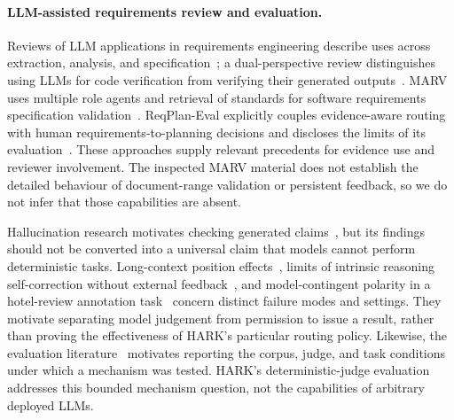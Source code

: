 \documentclass[computers,article,submit,moreauthors]{Definitions/mdpi}
\begin{document}
\paragraph{LLM-assisted requirements review and evaluation.}
Reviews of LLM applications in requirements engineering describe uses across extraction, analysis, and specification~\cite{hemmat2025}; a dual-perspective review distinguishes using LLMs for code verification from verifying their generated outputs~\cite{dolcetti2025}. MARV uses multiple role agents and retrieval of standards for software requirements specification validation~\cite{chinnam2025}. ReqPlan-Eval explicitly couples evidence-aware routing with human requirements-to-planning decisions and discloses the limits of its evaluation~\cite{alsawalqah2026}. These approaches supply relevant precedents for evidence use and reviewer involvement. The inspected MARV material does not establish the detailed behaviour of document-range validation or persistent feedback, so we do not infer that those capabilities are absent.

Hallucination research motivates checking generated claims~\cite{huang2025hall}, but its findings should not be converted into a universal claim that models cannot perform deterministic tasks. Long-context position effects~\cite{liu2024lost}, limits of intrinsic reasoning self-correction without external feedback~\cite{huang2024self}, and model-contingent polarity in a hotel-review annotation task~\cite{polarity2026} concern distinct failure modes and settings. They motivate separating model judgement from permission to issue a result, rather than proving the effectiveness of HARK's particular routing policy. Likewise, the evaluation literature~\cite{chang2024eval} motivates reporting the corpus, judge, and task conditions under which a mechanism was tested. HARK's deterministic-judge evaluation addresses this bounded mechanism question, not the capabilities of arbitrary deployed LLMs.
\end{document}
